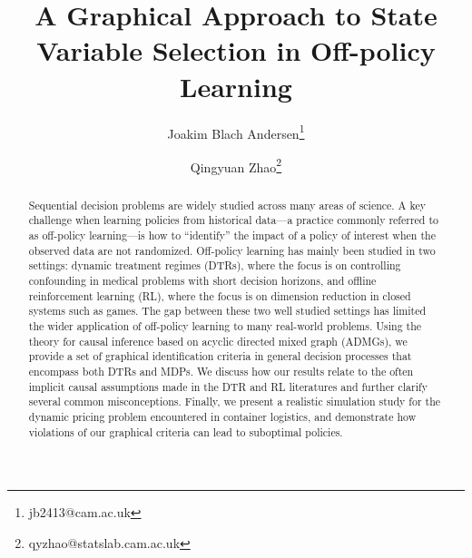 \documentclass[12pt,a4paper]{article}
\title{A Graphical Approach to State Variable Selection in Off-policy Learning}
\author[1,2]{Joakim Blach
  Andersen\footnote{jb2413@cam.ac.uk}}
\author[1]{Qingyuan Zhao\footnote{qyzhao@statslab.cam.ac.uk}}
\affil[1]{Statistical Laboratory, University of Cambridge, UK}
\affil[2]{A.P.\ Moller Maersk}
\date{}
\theoremstyle{definition}
\begin{document}
\maketitle

\begin{abstract}

  Sequential decision problems are widely studied across many areas
  of science. A key challenge when learning policies from historical
  data---a practice commonly referred to as off-policy learning---is
  how to ``identify'' the impact of a policy of interest when the
  observed data are not randomized.
  Off-policy learning has mainly been studied in two settings: dynamic
  treatment regimes (DTRs), where the focus is on controlling
  confounding in medical problems with short decision horizons, and
  offline reinforcement learning (RL), where the focus is on dimension
  reduction in closed systems %
  such as games. The gap between these two well studied settings has
  limited the wider application of off-policy learning to many
  real-world problems.
  Using the theory for causal inference based on acyclic directed
  mixed graph (ADMGs), we provide a set of graphical identification
  criteria in general decision processes that
  encompass both DTRs and MDPs. We discuss how our results relate to
  the often implicit causal assumptions made in the DTR and RL literatures
  and further clarify several common misconceptions. Finally, we
  present a realistic simulation study for the dynamic pricing problem
  encountered in container logistics, and demonstrate how violations
  of our graphical criteria can lead to suboptimal policies.


\end{abstract}
\end{document}

